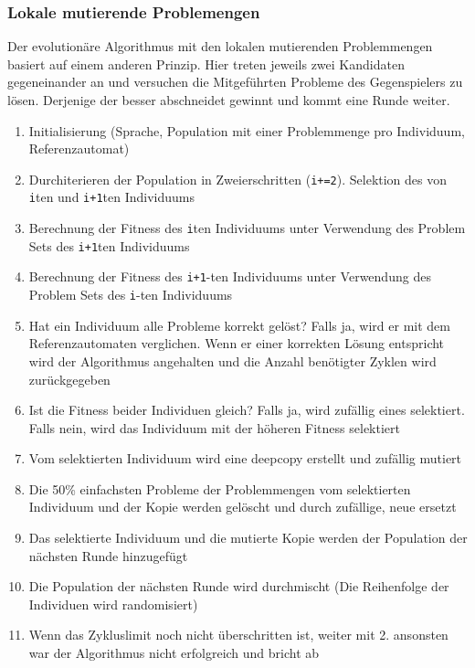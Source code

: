 \subsubsection{Lokale mutierende Problemengen}
\label{subsec:LocalEvolvingProblemSet}
Der evolutionäre Algorithmus mit den lokalen mutierenden Problemmengen basiert auf einem anderen Prinzip. Hier treten jeweils zwei Kandidaten gegeneinander an und versuchen die Mitgeführten Probleme des Gegenspielers zu lösen. Derjenige der besser abschneidet gewinnt und kommt eine Runde weiter.

\begin{enumerate}
\item Initialisierung (Sprache, Population mit einer Problemmenge pro Individuum, Referenzautomat)
\item Durchiterieren der Population in Zweierschritten (\lstinline$i+=2$). Selektion des von \lstinline$i$ten und \lstinline$i+1$ten Individuums
\item Berechnung der Fitness des \lstinline$i$ten Individuums unter Verwendung des Problem Sets des \lstinline$i+1$ten Individuums
\item Berechnung der Fitness des \lstinline$i+1$-ten Individuums unter Verwendung des Problem Sets des \lstinline$i$-ten Individuums
\item Hat ein Individuum alle Probleme korrekt gelöst? Falls ja, wird er mit dem Referenzautomaten verglichen. Wenn er einer korrekten Lösung entspricht wird der Algorithmus angehalten und die Anzahl benötigter Zyklen wird zurückgegeben
\item Ist die Fitness beider Individuen gleich? Falls ja, wird zufällig eines selektiert. Falls nein, wird das Individuum mit der höheren Fitness selektiert
\item Vom selektierten Individuum wird eine \Gls{deepcopy} erstellt und zufällig mutiert
\item Die 50\% einfachsten Probleme der Problemmengen vom selektierten Individuum und der Kopie werden gelöscht und durch zufällige, neue ersetzt 
\item Das selektierte Individuum und die mutierte Kopie werden der Population der nächsten Runde hinzugefügt
\item Die Population der nächsten Runde wird durchmischt (Die Reihenfolge der Individuen wird randomisiert)
\item Wenn das Zykluslimit noch nicht überschritten ist, weiter mit 2. ansonsten war der Algorithmus nicht erfolgreich und bricht ab
\end{enumerate}